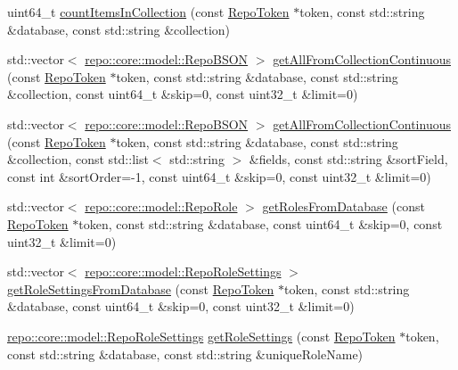 \begin{DoxyCompactItemize}
\item 
uint64\+\_\+t \hyperlink{class_repo_controller_1_1___repo_controller_impl_a57dc96a55a3dda0f9d62f13a100ee1cb}{count\+Items\+In\+Collection} (const \hyperlink{class_repo_controller_1_1_repo_token}{Repo\+Token} $\ast$token, const std\+::string \&database, const std\+::string \&collection)
\item 
std\+::vector$<$ \hyperlink{classrepo_1_1core_1_1model_1_1_repo_b_s_o_n}{repo\+::core\+::model\+::\+Repo\+B\+S\+O\+N} $>$ \hyperlink{class_repo_controller_1_1___repo_controller_impl_ab1aba8bba47dc9075515af4213b28e51}{get\+All\+From\+Collection\+Continuous} (const \hyperlink{class_repo_controller_1_1_repo_token}{Repo\+Token} $\ast$token, const std\+::string \&database, const std\+::string \&collection, const uint64\+\_\+t \&skip=0, const uint32\+\_\+t \&limit=0)
\item 
std\+::vector$<$ \hyperlink{classrepo_1_1core_1_1model_1_1_repo_b_s_o_n}{repo\+::core\+::model\+::\+Repo\+B\+S\+O\+N} $>$ \hyperlink{class_repo_controller_1_1___repo_controller_impl_afef3917eea5dce76a6aa6ee7d07d35e2}{get\+All\+From\+Collection\+Continuous} (const \hyperlink{class_repo_controller_1_1_repo_token}{Repo\+Token} $\ast$token, const std\+::string \&database, const std\+::string \&collection, const std\+::list$<$ std\+::string $>$ \&fields, const std\+::string \&sort\+Field, const int \&sort\+Order=-\/1, const uint64\+\_\+t \&skip=0, const uint32\+\_\+t \&limit=0)
\item 
std\+::vector$<$ \hyperlink{classrepo_1_1core_1_1model_1_1_repo_role}{repo\+::core\+::model\+::\+Repo\+Role} $>$ \hyperlink{class_repo_controller_1_1___repo_controller_impl_a224964ef041d64c75188069d5d3922d6}{get\+Roles\+From\+Database} (const \hyperlink{class_repo_controller_1_1_repo_token}{Repo\+Token} $\ast$token, const std\+::string \&database, const uint64\+\_\+t \&skip=0, const uint32\+\_\+t \&limit=0)
\item 
std\+::vector$<$ \hyperlink{classrepo_1_1core_1_1model_1_1_repo_role_settings}{repo\+::core\+::model\+::\+Repo\+Role\+Settings} $>$ \hyperlink{class_repo_controller_1_1___repo_controller_impl_a795906bcede3c32c1d2c4e01f052f8a9}{get\+Role\+Settings\+From\+Database} (const \hyperlink{class_repo_controller_1_1_repo_token}{Repo\+Token} $\ast$token, const std\+::string \&database, const uint64\+\_\+t \&skip=0, const uint32\+\_\+t \&limit=0)
\item 
\hyperlink{classrepo_1_1core_1_1model_1_1_repo_role_settings}{repo\+::core\+::model\+::\+Repo\+Role\+Settings} \hyperlink{class_repo_controller_1_1___repo_controller_impl_a22e8b8a068e7130a86f85f80ba5d51bd}{get\+Role\+Settings} (const \hyperlink{class_repo_controller_1_1_repo_token}{Repo\+Token} $\ast$token, const std\+::string \&database, const std\+::string \&unique\+Role\+Name)

\end{DoxyCompactItemize}
